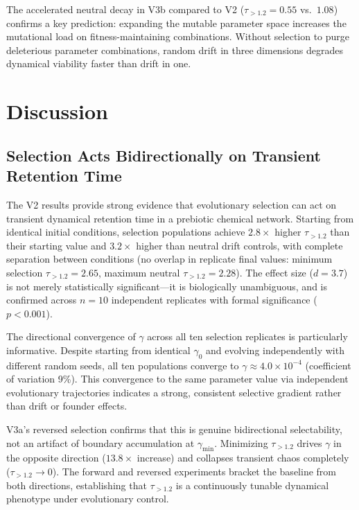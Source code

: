 \documentclass[twocolumn,showpacs,preprintnumbers,amsmath,amssymb,prd,floatfix]{revtex4-2}
\newcommand{\tauexp}{\tau_{>1.2}}
\begin{document}
The accelerated neutral decay in V3b compared to V2 ($\tauexp = 0.55$ vs.\ $1.08$) confirms a key prediction: expanding the mutable parameter space increases the mutational load on fitness-maintaining combinations. Without selection to purge deleterious parameter combinations, random drift in three dimensions degrades dynamical viability faster than drift in one.

\section{Discussion}
\label{sec:discussion}

\subsection{Selection Acts Bidirectionally on Transient Retention Time}

The V2 results provide strong evidence that evolutionary selection can act on transient dynamical retention time in a prebiotic chemical network. Starting from identical initial conditions, selection populations achieve $2.8\times$ higher $\tauexp$ than their starting value and $3.2\times$ higher than neutral drift controls, with complete separation between conditions (no overlap in replicate final values: minimum selection $\tauexp = 2.65$, maximum neutral $\tauexp = 2.28$). The effect size ($d = 3.7$) is not merely statistically significant---it is biologically unambiguous, and is confirmed across $n = 10$ independent replicates with formal significance ($p < 0.001$).

The directional convergence of $\gamma$ across all ten selection replicates is particularly informative. Despite starting from identical $\gamma_0$ and evolving independently with different random seeds, all ten populations converge to $\gamma \approx 4.0 \times 10^{-4}$ (coefficient of variation 9\%). This convergence to the same parameter value via independent evolutionary trajectories indicates a strong, consistent selective gradient rather than drift or founder effects.

V3a's reversed selection confirms that this is genuine bidirectional selectability, not an artifact of boundary accumulation at $\gamma_\text{min}$. Minimizing $\tauexp$ drives $\gamma$ in the opposite direction ($13.8\times$ increase) and collapses transient chaos completely ($\tauexp \to 0$). The forward and reversed experiments bracket the baseline from both directions, establishing that $\tauexp$ is a continuously tunable dynamical phenotype under evolutionary control.
\end{document}
